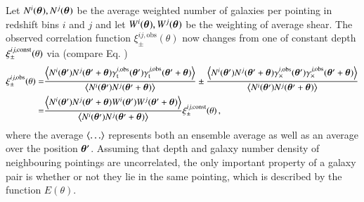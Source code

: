 Let $N^i(\b \theta),N^j(\b\theta)$ be the average weighted number of galaxies per pointing in redshift bins $i$ and $j$ and let $W^i(\b \theta),W^j(\b\theta)$ be the weighting of average shear. The observed correlation function $\xi^{ij,\text{obs}}_\pm(\theta)$ now changes from one of constant depth $\xi_\pm^{ij,\rm{const}}(\theta)$ via (compare Eq. )
\begin{align}
\xi^{ij,\text{obs}}_\pm(\theta) = & \frac{\la N^i(\bth)N^j(\bthp)\gamma^{i,\rm{obs}}_{\rm t}(\bth)\gamma^{j,\rm{obs}}_{\rm t}(\bthp)\ra }{\la N^i(\bth)N^j(\bthp)\ra} \pm \frac{\la N^i(\bth)N^j(\bthp)\gamma^{i,\rm{obs}}_\times(\bth)\gamma^{j,\rm{obs}}_\times(\bthp)\ra }{\la N^i(\bth)N^j(\bthp)\ra} \nonumber\\
 = & \frac{\la N^i(\bth)N^j(\bthp)W^i(\bth)W^j(\bthp)\ra}{\la N^i(\bth)N^j(\bthp)\ra} \xi_{\pm}^{ij,\rm{const}}(\theta) \, ,
 \label{eq:xipmblub1}
 \end{align}
 where the average $\la\ldots\ra$ represents both an ensemble average as well as an average over the position $\bth$.
 Assuming that depth and galaxy number density of neighbouring pointings are uncorrelated, the only important property of a galaxy pair is whether or not they lie in the same pointing, which is described by the function $E(\theta)$.

